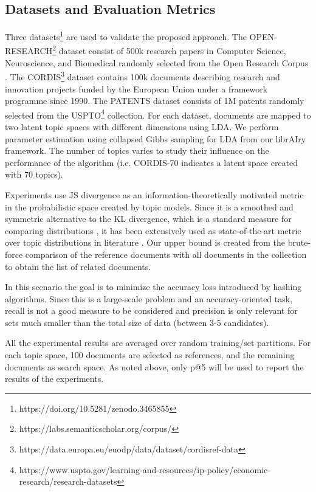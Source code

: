 \subsection{Datasets and Evaluation Metrics}
\label{sec:comparison-datasets}
Three datasets\footnote{https://doi.org/10.5281/zenodo.3465855} are used to validate the proposed approach. The OPEN-RESEARCH\footnote{https://labs.semanticscholar.org/corpus/} dataset consist of 500k research papers in Computer Science, Neuroscience, and Biomedical randomly selected from the Open Research Corpus \citep{Waleed2018}. The CORDIS\footnote{https://data.europa.eu/euodp/data/dataset/cordisref-data} dataset contains 100k documents describing research and innovation projects funded by the European Union under a framework programme since 1990. The PATENTS dataset consists of 1M patents randomly selected from the USPTO\footnote{https://www.uspto.gov/learning-and-resources/ip-policy/economic-research/research-datasets} collection. For each dataset, documents are mapped to two latent topic spaces with different dimensions using LDA. We perform parameter estimation using collapsed Gibbs sampling for LDA \citep{Griffiths2004b} from our librAIry  framework. The number of topics varies to study their influence on the performance of the algorithm (i.e. CORDIS-70 indicates a latent space created with 70 topics). 

Experiments use JS divergence as an information-theoretically motivated metric in the probabilistic space created by topic models. Since it is a smoothed and symmetric alternative to the KL divergence, which is a standard measure for comparing distributions \citep{Cha2007}, it has been extensively used as state-of-the-art metric over topic distributions in literature \citep{Towne2016, Aletras2017, Mao2017}. Our upper bound is created from the brute-force comparison of the reference documents with all documents in the collection to obtain the list of related documents.  

In this scenario the goal is to minimize the accuracy loss introduced by hashing algorithms. Since this is a large-scale problem and an accuracy-oriented task, recall is not a good measure to be considered and precision is only relevant for sets much smaller than the total size of data (between 3-5 candidates).

All the experimental results are averaged over random training/set partitions. For each topic space, 100 documents are selected as references, and the remaining documents as search space. As noted above, only p@5 will be used to report the results of the experiments.

